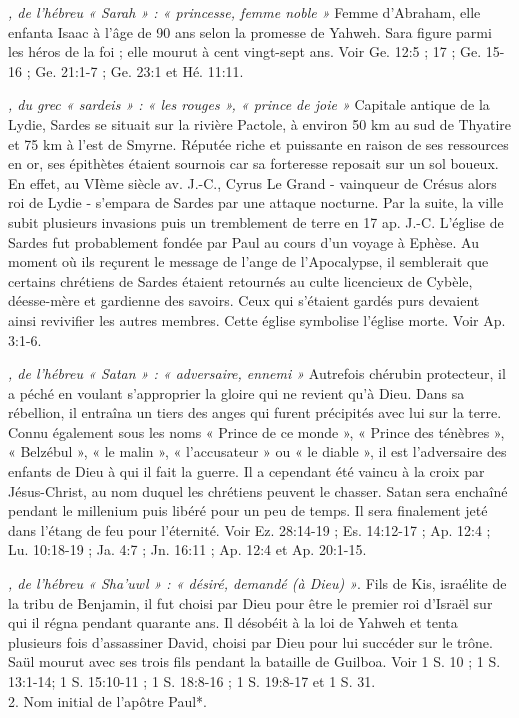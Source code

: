 \begin{multicols}{2}
\textit{, de l'hébreu « Sarah » : « princesse, femme noble »}\newline
Femme d'Abraham, elle enfanta Isaac à l'âge de 90 ans selon la promesse de Yahweh. Sara figure parmi les héros de la foi ; elle mourut à cent vingt-sept ans. Voir Ge. 12:5 ; 17 ; Ge. 15-16 ; Ge. 21:1-7 ; Ge. 23:1 et Hé. 11:11.

\textit{, du grec « sardeis » : « les rouges », « prince de joie »}\newline
Capitale antique de la Lydie, Sardes se situait sur la rivière Pactole, à environ 50 km au sud de Thyatire et 75 km à l'est de Smyrne. Réputée riche et puissante en raison de ses ressources en or, ses épithètes étaient sournois car sa forteresse reposait sur un sol boueux. En effet, au VIème siècle av. J.-C., Cyrus Le Grand - vainqueur de Crésus alors roi de Lydie - s'empara de Sardes par une attaque nocturne. Par la suite, la ville subit plusieurs invasions puis un tremblement de terre en 17 ap. J.-C. L'église de Sardes fut probablement fondée par Paul au cours d'un voyage à Ephèse. Au moment où ils reçurent le message de l'ange de l'Apocalypse, il semblerait que certains chrétiens de Sardes étaient retournés au culte licencieux de Cybèle, déesse-mère et gardienne des savoirs. Ceux qui s'étaient gardés purs devaient ainsi revivifier les autres membres. Cette église symbolise l'église morte. Voir Ap. 3:1-6.

\textit{, de l'hébreu « Satan » : « adversaire, ennemi »}\newline
Autrefois chérubin protecteur, il a péché en voulant s'approprier la gloire qui ne revient qu'à Dieu. Dans sa rébellion, il entraîna un tiers des anges qui furent précipités avec lui sur la terre. Connu également sous les noms « Prince de ce monde », « Prince des ténèbres », « Belzébul », « le malin », « l'accusateur » ou « le diable », il est l'adversaire des enfants de Dieu à qui il fait la guerre. Il a cependant été vaincu à la croix par Jésus-Christ, au nom duquel les chrétiens peuvent le chasser. Satan sera enchaîné pendant le millenium puis libéré pour un peu de temps. Il sera finalement jeté dans l'étang de feu pour l'éternité. Voir Ez. 28:14-19 ; Es. 14:12-17 ; Ap. 12:4 ; Lu. 10:18-19 ; Ja. 4:7 ; Jn. 16:11 ; Ap. 12:4 et Ap. 20:1-15.

\textit{, de l'hébreu « Sha'uwl » : « désiré, demandé (à Dieu) »}. Fils de Kis, israélite de la tribu de Benjamin, il fut choisi par Dieu pour être le premier roi d'Israël sur qui il régna pendant quarante ans. Il désobéit à la loi de Yahweh et tenta plusieurs fois d'assassiner David, choisi par Dieu pour lui succéder sur le trône. Saül mourut avec ses trois fils pendant la bataille de Guilboa. Voir 1 S. 10 ; 1 S. 13:1-14; 1 S. 15:10-11 ; 1 S. 18:8-16 ; 1 S. 19:8-17 et 1 S. 31.
\\2. Nom initial de l'apôtre Paul*.


\end{multicols}
